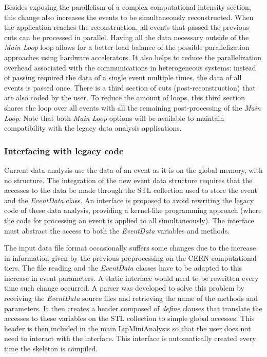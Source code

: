 Besides exposing the parallelism of a complex computational intensity section, this change also increases the events to be simultaneously reconstructed. When the application reaches the reconstruction, all events that passed the previous cuts can be processed in parallel. Having all the data necessary outside of the \textit{Main Loop} loop allows for a better load balance of the possible parallelization approaches using hardware accelerators. It also helps to reduce the parallelization overhead associated with the communications in heterogeneous systems: instead of passing required the data of a single event multiple times, the data of all events is passed once. There is a third section of cuts (post-reconstruction) that are also coded by the user. To reduce the amount of loops, this third section shares the loop over all events with all the remaining post-processing of the \textit{Main Loop}. Note that both \textit{Main Loop} options will be available to maintain compatibility with the legacy data analysis applications.

\subsubsection*{Interfacing with legacy code}

Current data analysis use the data of an event as it is on the global memory, with no structure. The integration of the new event data structure requires that the accesses to the data be made through the STL collection used to store the event and the \textit{EventData} class. An interface is proposed to avoid rewriting the legacy code of these data analysis, providing a kernel-like programming approach (where the code for processing an event is applied to all simultaneously). The interface must abstract the access to both the \textit{EventData} variables and methods.

The input data file format occasionally suffers some changes due to the increase in information given by the previous preprocessing on the CERN computational tiers. The file reading and the \textit{EventData} classes have to be adapted to this increase in event parameters. A static interface would need to be rewritten every time such change occurred. A parser was developed to solve this problem by receiving the \textit{EventData} source files and retrieving the name of the methods and parameters. It then creates a header composed of \textit{define} clauses that translate the accesses to these variables on the STL collection to simple global accesses. This header is then included in the main LipMiniAnalysis so that the user does not need to interact with the interface. This interface is automatically created every time the skeleton is compiled.

